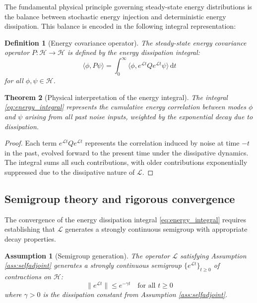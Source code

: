 \documentclass[a4paper,12pt]{article}
\newtheorem{assumption}{Assumption}[section]
\newtheorem{theorem}{Theorem}[section]
\newtheorem{definition}[theorem]{Definition}
\newcommand{\dd}{\,\mathrm{d}}
\def\H{\mathcal{H}}
\newcommand{\inner}[2]{\langle #1, #2 \rangle}
\begin{document}
The fundamental physical principle governing steady-state energy distributions is the balance between stochastic energy injection and deterministic energy dissipation. This balance is encoded in the following integral representation:

\begin{definition}[Energy covariance operator]\label{def:energy_covariance}
The steady-state energy covariance operator $P: \H \to \H$ is defined by the energy dissipation integral:
\begin{equation}\label{eq:energy_integral}
\inner{\phi}{P\psi} = \int_0^{\infty} \inner{\phi}{e^{\mathcal{L}t} Q e^{\mathcal{L}t} \psi} \dd t
\end{equation}
for all $\phi, \psi \in \H$.
\end{definition}

\begin{theorem}[Physical interpretation of the energy integral]\label{thm:physical_meaning}
The integral \eqref{eq:energy_integral} represents the cumulative energy correlation between modes $\phi$ and $\psi$ arising from all past noise inputs, weighted by the exponential decay due to dissipation.
\end{theorem}

\begin{proof}
Each term $e^{\mathcal{L}t} Q e^{\mathcal{L}t}$ represents the correlation induced by noise at time $-t$ in the past, evolved forward to the present time under the dissipative dynamics. The integral sums all such contributions, with older contributions exponentially suppressed due to the dissipative nature of $\mathcal{L}$.
\end{proof}

\subsection{Semigroup theory and rigorous convergence}\label{sec:semigroup}

The convergence of the energy dissipation integral \eqref{eq:energy_integral} requires establishing that $\mathcal{L}$ generates a strongly continuous semigroup with appropriate decay properties.

\begin{assumption}[Semigroup generation]\label{ass:semigroup}
The operator $\mathcal{L}$ satisfying Assumption \ref{ass:selfadjoint} generates a strongly continuous semigroup $\{e^{\mathcal{L}t}\}_{t \geq 0}$ of contractions on $\H$:
\begin{equation}
\|e^{\mathcal{L}t}\| \leq e^{-\gamma t} \quad \text{for all } t \geq 0
\end{equation}
where $\gamma > 0$ is the dissipation constant from Assumption \ref{ass:selfadjoint}.
\end{assumption}
\end{document}
